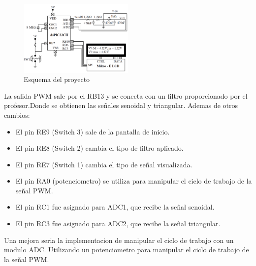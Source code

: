 \documentclass{article}
\begin{document}
\begin{figure}[H]
    \centering
    \includegraphics[width=0.5\textwidth]{images/esquema_og.png} %
    \caption{Esquema del proyecto}
    \label{fig:esquema}
\end{figure}
La salida PWM sale por el RB13 y se conecta con un filtro proporcionado por el profesor.Donde se obtienen las señales senoidal y triangular.
Ademas de otros cambios:
\begin{itemize}
    \item El pin RE9 (Switch 3) sale de la pantalla de inicio.
    \item El pin RE8 (Switch 2) cambia el tipo de filtro aplicado.
    \item El pin RE7 (Switch 1) cambia el tipo de señal visualizada.
    \item El pin RA0 (potenciometro) se utiliza para manipular el ciclo de trabajo de la señal PWM.
    \item El pin RC1 fue asignado para ADC1, que recibe la señal senoidal.
    \item El pin RC3 fue asignado para ADC2, que recibe la señal triangular.
\end{itemize}
    Una mejora seria la implementacion de manipular el ciclo de trabajo con un modulo ADC. Utilizando un potenciometro para manipular el ciclo de trabajo de la señal PWM.
\end{document}
